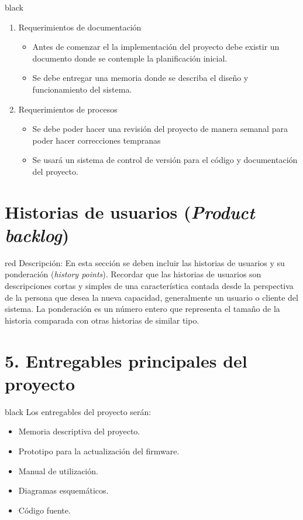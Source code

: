 \documentclass[11pt]{charter}
\begin{document}
\begin{consigna}{black}
\begin{enumerate}
\begin{enumerate}
\begin{enumerate}
	\end{enumerate}
	\item Requerimientos de documentación
	\begin{itemize}
		\item Antes de comenzar el la implementación del proyecto debe existir un documento donde se contemple la planificación inicial.
		\item Se debe entregar una memoria donde se describa el diseño y funcionamiento del sistema.
	\end{itemize}
    \item Requerimientos de procesos
    \begin{itemize}
    	\item Se debe poder hacer una revisión del proyecto de manera semanal para poder hacer correcciones tempranas
    	\item Se usará un sistema de control de versión para el código y documentación del proyecto.
    \end{itemize}
	\end{enumerate}
\end{enumerate}

\end{consigna}

\section{Historias de usuarios (\textit{Product backlog})}
\label{sec:backlog}

\begin{consigna}{red}
Descripción: En esta sección se deben incluir las historias de usuarios y su ponderación (\textit{history points}). Recordar que las historias de usuarios son descripciones cortas y simples de una característica contada desde la perspectiva de la persona que desea la nueva capacidad, generalmente un usuario o cliente del sistema. La ponderación es un número entero que representa el tamaño de la historia comparada con otras historias de similar tipo.
\end{consigna}

\section{5. Entregables principales del proyecto}
\label{sec:entregables}

\begin{consigna}{black}
Los entregables del proyecto serán:
\begin{itemize}
\item Memoria descriptiva del proyecto.
\item Prototipo para la actualización del firmware.
\item Manual de utilización.
\item Diagramas esquemáticos.
\item Código fuente.

\end{itemize}

\end{consigna}
\end{document}
